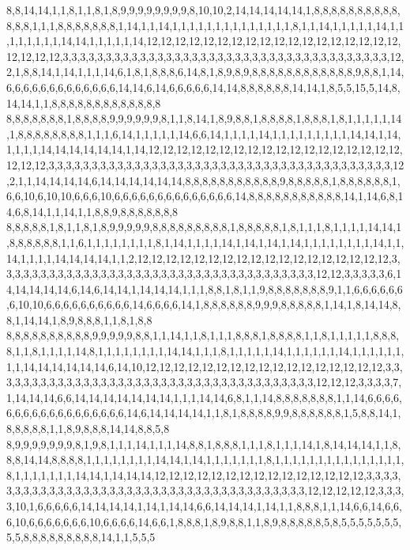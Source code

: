 8,8,14,14,1,1,8,1,1,8,1,8,9,9,9,9,9,9,9,9,8,10,10,2,14,14,14,14,14,1,8,8,8,8,8,8,8,8,8,8,8,8,8,1,1,1,8,8,8,8,8,8,8,1,14,1,1,14,1,1,1,1,1,1,1,1,1,1,1,1,1,1,8,1,1,14,1,1,1,1,1,14,1,1,1,1,1,1,1,1,14,14,1,1,1,1,1,14,12,12,12,12,12,12,12,12,12,12,12,12,12,12,12,12,12,12,12,12,12,12,3,3,3,3,3,3,3,3,3,3,3,3,3,3,3,3,3,3,3,3,3,3,3,3,3,3,3,3,3,3,3,3,3,3,3,3,3,3,12,2,1,8,8,14,1,14,1,1,1,14,6,1,8,1,8,8,8,6,14,8,1,8,9,8,9,8,8,8,8,8,8,8,8,8,8,8,8,9,8,8,1,14,6,6,6,6,6,6,6,6,6,6,6,6,6,14,14,6,14,6,6,6,6,6,14,14,8,8,8,8,8,8,14,14,1,8,5,5,15,5,14,8,14,14,1,1,8,8,8,8,8,8,8,8,8,8,8,8,8
8,8,8,8,8,8,8,1,8,8,8,8,9,9,9,9,9,9,8,1,1,8,14,1,8,9,8,8,1,8,8,8,8,1,8,8,8,1,8,1,1,1,1,1,14,1,8,8,8,8,8,8,8,8,1,1,1,6,14,1,1,1,1,1,14,6,6,14,1,1,1,1,14,1,1,1,1,1,1,1,1,1,14,14,1,14,1,1,1,1,14,14,14,14,14,14,1,14,12,12,12,12,12,12,12,12,12,12,12,12,12,12,12,12,12,12,12,12,12,3,3,3,3,3,3,3,3,3,3,3,3,3,3,3,3,3,3,3,3,3,3,3,3,3,3,3,3,3,3,3,3,3,3,3,3,3,3,3,3,12,2,1,1,14,14,14,14,6,14,14,14,14,14,14,8,8,8,8,8,8,8,8,8,8,8,9,8,8,8,8,8,1,8,8,8,8,8,8,1,6,6,10,6,10,10,6,6,6,10,6,6,6,6,6,6,6,6,6,6,6,6,6,6,14,8,8,8,8,8,8,8,8,8,8,8,14,1,14,6,8,14,6,8,14,1,1,14,1,1,8,8,9,8,8,8,8,8,8,8
8,8,8,8,8,1,8,1,1,8,1,8,9,9,9,9,9,8,8,8,8,8,8,8,8,8,1,8,8,8,8,8,1,8,1,1,1,8,1,1,1,1,14,14,1,8,8,8,8,8,8,1,1,6,1,1,1,1,1,1,1,1,8,1,14,1,1,1,1,14,1,14,1,14,1,14,1,1,1,1,1,1,1,1,14,1,1,14,1,1,1,1,14,14,14,14,1,1,2,12,12,12,12,12,12,12,12,12,12,12,12,12,12,12,12,12,12,3,3,3,3,3,3,3,3,3,3,3,3,3,3,3,3,3,3,3,3,3,3,3,3,3,3,3,3,3,3,3,3,3,3,3,3,3,12,12,3,3,3,3,3,6,14,14,14,14,14,6,14,6,14,14,1,14,14,14,1,1,1,8,8,1,8,1,1,9,8,8,8,8,8,8,8,9,1,1,6,6,6,6,6,6,6,10,10,6,6,6,6,6,6,6,6,6,6,14,6,6,6,6,14,1,8,8,8,8,8,8,9,9,9,8,8,8,8,8,1,14,1,8,14,14,8,8,1,14,14,1,8,9,8,8,8,1,1,8,1,8,8
8,8,8,8,8,8,8,8,8,8,9,9,9,9,9,8,8,1,1,14,1,1,8,1,1,1,8,8,8,1,8,8,8,8,1,1,8,1,1,1,1,1,8,8,8,8,1,1,8,1,1,1,1,14,8,1,1,1,1,1,1,1,1,14,14,1,1,1,8,1,1,1,1,1,14,1,1,1,1,1,1,14,1,1,1,1,1,1,1,1,14,14,14,14,14,14,6,14,10,12,12,12,12,12,12,12,12,12,12,12,12,12,12,12,12,12,3,3,3,3,3,3,3,3,3,3,3,3,3,3,3,3,3,3,3,3,3,3,3,3,3,3,3,3,3,3,3,3,3,3,3,3,3,3,12,12,12,3,3,3,3,7,1,14,14,14,6,6,14,14,14,14,14,14,14,1,1,1,14,14,6,8,1,1,14,8,8,8,8,8,8,8,1,1,14,6,6,6,6,6,6,6,6,6,6,6,6,6,6,6,6,6,6,14,6,14,14,14,14,1,1,8,1,8,8,8,8,9,9,8,8,8,8,8,8,1,5,8,8,14,1,8,8,8,8,8,1,1,8,9,8,8,8,14,14,8,8,5,8
8,9,9,9,9,9,9,9,8,1,9,8,1,1,1,14,1,1,1,14,8,8,1,8,8,8,1,1,1,8,1,1,1,14,1,8,14,14,14,1,1,8,8,8,14,14,8,8,8,8,1,1,1,1,1,1,1,1,14,14,1,14,1,1,1,1,1,1,1,8,1,1,1,1,1,1,1,1,1,1,1,1,1,1,1,8,1,1,1,1,1,1,1,14,14,1,14,14,14,12,12,12,12,12,12,12,12,12,12,12,12,12,12,12,3,3,3,3,3,3,3,3,3,3,3,3,3,3,3,3,3,3,3,3,3,3,3,3,3,3,3,3,3,3,3,3,3,3,3,3,3,3,3,12,12,12,12,12,3,3,3,3,10,1,6,6,6,6,6,14,14,14,14,1,14,1,14,14,6,6,14,14,14,1,14,1,1,8,8,8,1,1,14,6,6,14,6,6,6,10,6,6,6,6,6,6,6,10,6,6,6,6,14,6,6,1,8,8,8,1,8,9,8,8,1,1,8,9,8,8,8,8,8,5,8,5,5,5,5,5,5,5,5,5,8,8,8,8,8,8,8,8,8,14,1,1,5,5,5
